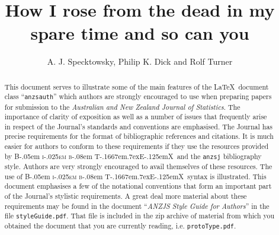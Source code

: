 \documentclass[times, doublespace]{anzsauth}
\title{How I rose from the dead in my spare time and so can you}
\author{A. J. Specktowsky\addressnum{1}, Philip K. Dick\addressnum{2} and
Rolf Turner\addressnum{3}\corrauth}
\affiliation{School of Hard Knocks, Sirius Cybernetics Corporation and
the University of Orcland
}
\newcommand\BibTeX{{\rmfamily B\kern-.05em \textsc{i\kern-.025em b}\kern-.08em
T\kern-.1667em\lower.7ex\hbox{E}\kern-.125emX}}
\begin{document}
\begin{abstract}
This document serves to illustrate some of the main features of
the \LaTeX\ document class ``\texttt{anzsauth}'' which authors are
strongly encouraged to use when preparing papers for submission
to the \textit{Australian and New Zealand Journal of Statistics}.
The importance of clarity of exposition as well as a number of
issues that frequently arise in respect of the Journal's standards
and conventions are emphasised.  The Journal has precise requirements
for the format of bibliographic references and citations.  It is much
easier for authors to conform to these requirements if they use the
resources provided by \BibTeX\ and the \texttt{anzsj} bibliography
style.  Authors are very strongly encouraged to avail themselves
of these resources.  The use of \BibTeX\ syntax is illustrated.
This document emphasises a few of the notational conventions that
form an important part of the Journal's stylistic requirements.
A great deal more material about these requirements may be found
in the document ``\textit{ANZJS Style Guide for Authors}'' in the
file \texttt{styleGuide.pdf}.  That file is included in the zip
archive of material from which you obtained the document that you
are currently reading, i.e. \texttt{protoType.pdf}.
\end{abstract}


\end{document}
